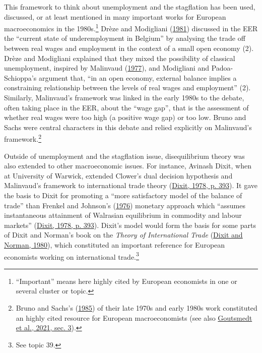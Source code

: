 \documentclass[]{elsarticle} %
\begin{document}
This framework to think about unemployment and the stagflation has been
used, discussed, or at least mentioned in many important works for
European macroeconomics in the 1980s.\footnote{``Important'' means here
  highly cited by European economists in one or several cluster or
  topic.} Drèze and Modigliani (\protect\hyperlink{ref-dreze1981}{1981})
discussed in the EER the ``current state of underemployment in Belgium''
by analysing the trade off between real wages and employment in the
context of a small open economy (2). Drèze and Modigliani explained that
they mixed the possibility of classical unemployment, inspired by
Malinvaud (\protect\hyperlink{ref-malinvaud1977}{1977}), and Modigliani
and Padoa-Schioppa's argument that, ``in an open economy, external
balance implies a constraining relationship between the levels of real
wages and employment'' (2). Similarly, Malinvaud's framework was linked
in the early 1980s to the debate, often taking place in the EER, about
the ``wage gap'', that is the assessment of whether real wages were too
high (a positive wage gap) or too low. Bruno and Sachs were central
characters in this debate and relied explicitly on Malinvaud's
framework.\footnote{Bruno and Sachs's
  (\protect\hyperlink{ref-brunosachs1985}{1985}) of their late 1970s and
  early 1980s work constituted an highly cited resource for European
  macroeconomists (see also
  \protect\hyperlink{ref-goutsmedt2021}{Goutsmedt et al., 2021, sec.
  3}).}

Outside of unemployment and the stagflation issue, disequilibrium theory
was also extended to other macroeconomic issues. For instance, Avinash
Dixit, when at University of Warwick, extended Clower's dual decision
hypothesis and Malinvaud's framework to international trade theory
(\protect\hyperlink{ref-dixit1978}{Dixit, 1978, p. 393}). It gave the
basis to Dixit for promoting a ``more satisfactory model of the balance
of trade'' than Frenkel and Johnson's
(\protect\hyperlink{ref-frenkel1976}{1976}) monetary approach which
``assumes instantaneous attainment of Walrasian equilibrium in commodity
and labour markets'' (\protect\hyperlink{ref-dixit1978}{Dixit, 1978, p.
393}). Dixit's model would form the basis for some parts of Dixit and
Norman's book on the \emph{Theory of International Trade}
(\protect\hyperlink{ref-dixit1980}{Dixit and Norman, 1980}), which
constituted an important reference for European economists working on
international trade.\footnote{See topic 39.}
\end{document}
